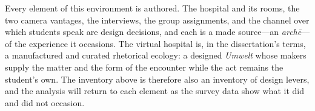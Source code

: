 Every element of this environment is authored. The hospital and its rooms, the
two camera vantages, the interviews, the group assignments, and the channel
over which students speak are design decisions, and each is a made source---an
\textit{arch\=e}---of the experience it occasions. The virtual hospital is, in
the dissertation's terms, a manufactured and curated rhetorical ecology: a
designed \textit{Umwelt} whose makers supply the matter and the form of the
encounter while the act remains the student's own. The inventory above is
therefore also an inventory of design levers, and the analysis will return to
each element as the survey data show what it did and did not occasion.


